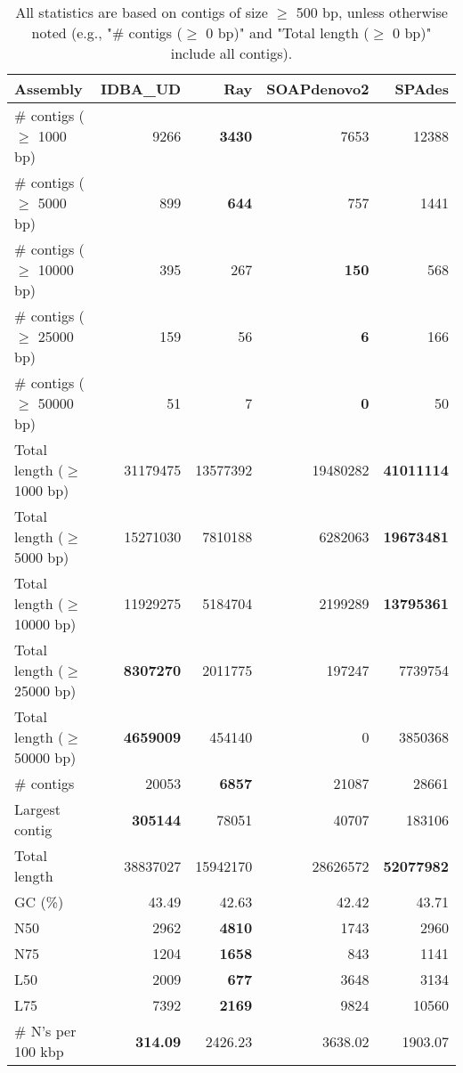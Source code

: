 \documentclass[12pt,a4paper]{article}
\begin{document}
\begin{table}[ht]
\begin{center}
\caption{All statistics are based on contigs of size $\geq$ 500 bp, unless otherwise noted (e.g., "\# contigs ($\geq$ 0 bp)" and "Total length ($\geq$ 0 bp)" include all contigs).}
\begin{tabular}{|l*{4}{|r}|}
\hline
Assembly & IDBA\_UD & Ray & SOAPdenovo2 & SPAdes \\ \hline
\# contigs ($\geq$ 1000 bp) & 9266 & {\bf 3430} & 7653 & 12388 \\ \hline
\# contigs ($\geq$ 5000 bp) & 899 & {\bf 644} & 757 & 1441 \\ \hline
\# contigs ($\geq$ 10000 bp) & 395 & 267 & {\bf 150} & 568 \\ \hline
\# contigs ($\geq$ 25000 bp) & 159 & 56 & {\bf 6} & 166 \\ \hline
\# contigs ($\geq$ 50000 bp) & 51 & 7 & {\bf 0} & 50 \\ \hline
Total length ($\geq$ 1000 bp) & 31179475 & 13577392 & 19480282 & {\bf 41011114} \\ \hline
Total length ($\geq$ 5000 bp) & 15271030 & 7810188 & 6282063 & {\bf 19673481} \\ \hline
Total length ($\geq$ 10000 bp) & 11929275 & 5184704 & 2199289 & {\bf 13795361} \\ \hline
Total length ($\geq$ 25000 bp) & {\bf 8307270} & 2011775 & 197247 & 7739754 \\ \hline
Total length ($\geq$ 50000 bp) & {\bf 4659009} & 454140 & 0 & 3850368 \\ \hline
\# contigs & 20053 & {\bf 6857} & 21087 & 28661 \\ \hline
Largest contig & {\bf 305144} & 78051 & 40707 & 183106 \\ \hline
Total length & 38837027 & 15942170 & 28626572 & {\bf 52077982} \\ \hline
GC (\%) & 43.49 & 42.63 & 42.42 & 43.71 \\ \hline
N50 & 2962 & {\bf 4810} & 1743 & 2960 \\ \hline
N75 & 1204 & {\bf 1658} & 843 & 1141 \\ \hline
L50 & 2009 & {\bf 677} & 3648 & 3134 \\ \hline
L75 & 7392 & {\bf 2169} & 9824 & 10560 \\ \hline
\# N's per 100 kbp & {\bf 314.09} & 2426.23 & 3638.02 & 1903.07 \\ \hline
\end{tabular}
\end{center}
\end{table}
\end{document}
